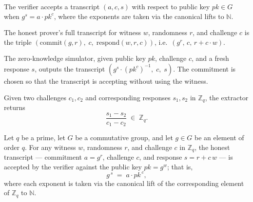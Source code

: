 \begin{definition}
\label{Schnorr.Verify}
\leanok
The verifier accepts a transcript $(a, c, s)$ with respect to public key
$\mathit{pk} \in G$ when $g^s = a \cdot \mathit{pk}^{c}$, where the
exponents are taken via the canonical lifts to $\mathbb{N}$.
\end{definition}

\begin{definition}
\label{Schnorr.honest}
\leanok
{}
The honest prover's full transcript for witness $w$, randomness $r$, and
challenge $c$ is the triple $(\mathrm{commit}(g, r),\; c,\; \mathrm{respond}(w, r, c))$,
i.e.\ $(g^r,\, c,\, r + c \cdot w)$.
\end{definition}

\begin{definition}
\label{Schnorr.simulate}
\leanok
{}
The zero-knowledge simulator, given public key $\mathit{pk}$, challenge $c$,
and a fresh response $s$, outputs the transcript
$(g^s \cdot (\mathit{pk}^c)^{-1},\; c,\; s)$.
The commitment is chosen so that the transcript is accepting without using the
witness.
\end{definition}

\begin{definition}
\label{Schnorr.extract}
\leanok
Given two challenges $c_1, c_2$ and corresponding responses $s_1, s_2$ in
$\mathbb{Z}_q$, the extractor returns
\[
  \frac{s_1 - s_2}{c_1 - c_2} \;\in\; \mathbb{Z}_q.
\]
\end{definition}

\begin{theorem}
\label{Schnorr.schnorr_completeness}
\leanok
{}
Let $q$ be a prime, let $G$ be a commutative group, and let $g \in G$ be an element of
order $q$. For any witness $w$, randomness $r$, and challenge $c$ in $\mathbb{Z}_q$, the
honest transcript — commitment $a = g^{r}$, challenge $c$, and response $s = r + c\,w$ —
is accepted by the verifier against the public key $\mathit{pk} = g^{w}$; that is,
\[
  g^{\,s} \;=\; a \cdot \mathit{pk}^{\,c},
\]
where each exponent is taken via the canonical lift of the corresponding element of
$\mathbb{Z}_q$ to $\mathbb{N}$.
\end{theorem}

